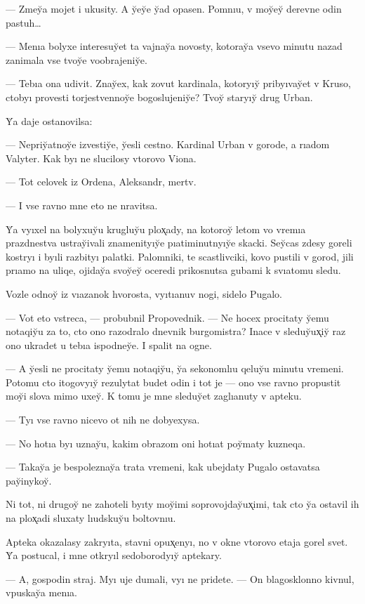 \documentclass[10pt]{book}
\begin{document}
— Zmey̆a mojet i ukusity. A y̆ey̆e y̆ad opasen. Pomnıu, v moy̆ey̆ derevne odin pastuh…

— Menıa bolyxe interesuy̆et ta vajnay̆a novosty, kotoray̆a vsevo minutu nazad zanimala vse tvoy̆e voobrajeniy̆e.

— Tebıa ona udivit. Znay̆ex, kak zovut kardinala, kotoryıy̆ pribyıvay̆et v Kruso, ctobyı provesti torjestvennoy̆e bogoslujeniy̆e? Tvoy̆ staryıy̆ drug Urban.

Y̆a daje ostanovilsa:

— Nepriy̆atnoy̆e izvestiy̆e, y̆esli cestno. Kardinal Urban v gorode, a rıadom Valyter. Kak byı ne slucilosy vtorovo Viona.

— Tot celovek iz Ordena, Aleksandr, mertv.

— I vse ravno mne eto ne nravitsa.

Y̆a vyıxel na bolyxuy̆u krugluy̆u plox̨ady, na kotoroy̆ letom vo vremıa prazdnestva ustray̆ivali znamenityıy̆e pıatiminutnyıy̆e skacki. Sey̆cas zdesy goreli kostryı i byıli razbityı palatki. Palomniki, te scastlivciki, kovo pustili v gorod, jili prıamo na uliqe, ojiday̆a svoy̆ey̆ oceredi prikosnutsa gubami k svıatomu sledu.

Vozle odnoy̆ iz vıazanok hvorosta, vyıtıanuv nogi, sidelo Pugalo.

— Vot eto vstreca, — probubnil Propovednik. — Ne hocex procitaty y̆emu notaqiy̆u za to, cto ono razodralo dnevnik burgomistra? Inace v sleduy̆ux̨iy̆ raz ono ukradet u tebıa ispodney̆e. I spalit na ogne.

— A y̆esli ne procitaty y̆emu notaqiy̆u, y̆a sekonomlıu qeluy̆u minutu vremeni. Potomu cto itogovyıy̆ rezulytat budet odin i tot je — ono vse ravno propustit moy̆i slova mimo uxey̆. K tomu je mne sleduy̆et zaglıanuty v apteku.

— Tyı vse ravno nicevo ot nih ne dobyexysa.

— No hotıa byı uznay̆u, kakim obrazom oni hotıat poy̆maty kuzneqa.

— Takay̆a je bespoleznay̆a trata vremeni, kak ubejdaty Pugalo ostavatsa pay̆inykoy̆.

Ni tot, ni drugoy̆ ne zahoteli byıty moy̆imi soprovojday̆ux̨imi, tak cto y̆a ostavil ih na plox̨adi sluxaty lıudskuy̆u boltovnıu.

Apteka okazalasy zakryıta, stavni opux̨enyı, no v okne vtorovo etaja gorel svet. Y̆a postucal, i mne otkryıl sedoborodyıy̆ aptekary.

— A, gospodin straj. Myı uje dumali, vyı ne pridete. — On blagosklonno kivnul, vpuskay̆a menıa.
\end{document}
